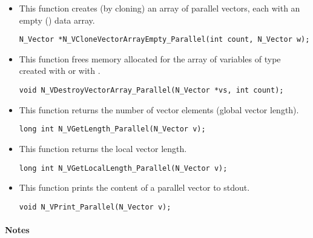 \begin{itemize}

\item {}
 
  This function creates (by cloning) an array of  parallel vectors,
  each with an empty () data array.
 
\begin{verbatim}
N_Vector *N_VCloneVectorArrayEmpty_Parallel(int count, N_Vector w);
\end{verbatim}


\item {}
 
 This function frees memory allocated for the array of   variables of
 type  created with  or with
 .
 

 \verb|void N_VDestroyVectorArray_Parallel(N_Vector *vs, int count);|



\item {}

 This function returns the number of vector elements (global vector length).

 
 
 \verb|long int N_VGetLength_Parallel(N_Vector v);|


\item {}

 This function returns the local vector length.

 
 
 \verb|long int N_VGetLocalLength_Parallel(N_Vector v);|


\item {}
  
  This function prints the content of a parallel vector to stdout.
 
    
  \verb|void N_VPrint_Parallel(N_Vector v);|


\end{itemize}
\paragraph{\bf Notes} 
           
